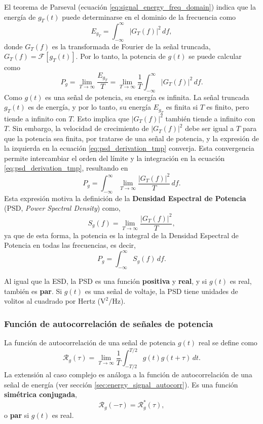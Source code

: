 \documentclass[a4paper]{article}
\begin{document}
El teorema de Parseval (ecuación \ref{eq:signal_energy_freq_domain}) indica que la energía de \(g_T(t)\) puede determinarse en el dominio de la frecuencia como
\[
 E_{g_T}=\int_{-\infty}^{\infty}|G_T(f)|^2\,df,
\]
donde \(G_T(f)\) es la transformada de Fourier de la señal truncada, \(G_T(f)=\mathcal{F}\left[g_T(t)\right]\). Por lo tanto, la potencia de \(g(t)\) se puede calcular como
\begin{equation}\label{eq:psd_derivation_tmp}
 P_g =  \lim_{T\to\infty}\frac{E_{g_T}}{T} = \lim_{T\to\infty}\frac{1}{T}\int_{-\infty}^{\infty}|G_T(f)|^2\,df.
\end{equation}
Como \(g(t)\) es una señal de potencia, su energía es infinita. La señal truncada \(g_T(t)\) es de energía, y por lo tanto, su energía \(E_{g_T}\) es finita si \(T\) es finito, pero tiende a infinito con \(T\). Esto implica que \(|G_T(f)|^2\) también tiende a infinito con \(T\). Sin embargo, la velocidad de crecimiento de \(|G_T(f)|^2\) debe ser igual a \(T\) para que la potencia sea finita, por tratarse de una señal de potencia, y la expresión de la izquierda en la ecuación \ref{eq:psd_derivation_tmp} converja. Esta convergencia permite intercambiar el orden del límite y la integración en la ecuación \ref{eq:psd_derivation_tmp}, resultando en
\begin{equation}\label{eq:signal_power_freq_domain}
 P_g = \int_{-\infty}^{\infty}\lim_{T\to\infty}\frac{|G_T(f)|^2}{T}\,df.
\end{equation}
Esta expresión motiva la definición de la \textbf{Densidad Espectral de Potencia} (PSD, \emph{Power Spectral Density}) como,
\begin{equation}\label{eq:psd_definition}
 S_g(f) = \lim_{T\to\infty}\frac{|G_T(f)|^2}{T},
\end{equation}
ya que de esta forma, la potencia es la integral de la Densidad Espectral de Potencia en todas las frecuencias, es decir,
\[
 P_g = \int_{-\infty}^{\infty}S_g(f)\,df.
\]

Al igual que la ESD, la PSD es una función \textbf{positiva} y \textbf{real}, y si \(g(t)\) es real, también es \textbf{par}. Si \(g(t)\) es una señal de voltaje, la PSD tiene unidades de volitos al cuadrado por Hertz (\(\textrm{V}^2/\textrm{Hz}\)).

\subsubsection{Función de autocorrelación de señales de potencia}

La función de autocorrelación de una señal de potencia \(g(t)\) real se define como
\begin{equation}\label{eq:deterministic_autocorr_power_signal_def}
 \mathcal{R}_g(\tau)=\lim_{T\to\infty}\frac{1}{T}\int_{-T/2}^{T/2}g(t)g(t+\tau)\,dt.
\end{equation}
La extensión al caso complejo es análoga a la función de autocorrelación de una señal de energía (ver sección \ref{sec:energy_signal_autocorr}). Es una función \textbf{simétrica conjugada},
\[
 \mathcal{R}_g(-\tau) = \mathcal{R}^*_g(\tau),
\]
o \textbf{par} si \(g(t)\) es real.
\end{document}
